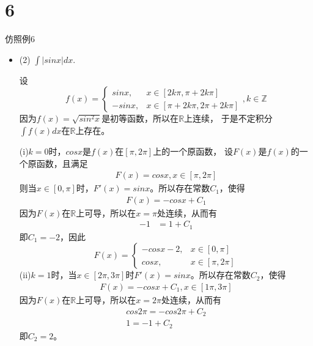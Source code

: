 \documentclass{article}
\begin{document}
\section*{6}

仿照例6

\begin{itemize}
  \item (2) $\int |sinx| dx$.

        设
        \begin{equation*}
          f(x) =
          \begin{cases}
            sinx,  & x \in [2k \pi, \pi + 2k \pi]        \\
            -sinx, & x \in [\pi + 2k \pi, 2\pi + 2k \pi]
          \end{cases}
          , k \in \mathbb{Z}
        \end{equation*}
        因为$f(x) = \sqrt{sin^2x}$是初等函数，所以在$\mathbb{R}$上连续，
        于是不定积分$\int f(x) dx$在$\mathbb{R}$上存在。

        (i)$k = 0$时，$cosx$是$f(x)$在$[\pi, 2\pi]$上的一个原函数，
        设$F(x)$是$f(x)$的一个原函数，且满足
        \begin{align*}
          F(x) = cos x, x \in [\pi, 2\pi]
        \end{align*}
        则当$x \in [0, \pi]$时，$F'(x) = sinx$。所以存在常数$C_1$，使得
        \begin{align*}
          F(x) = -cosx + C_1
        \end{align*}
        因为$F(x)$在$\mathbb{R}$上可导，所以在$x = \pi$处连续，从而有
        \begin{align*}
          -1 & = 1 + C_1
        \end{align*}
        即$C_1 = -2$，因此
        \begin{equation*}
          F(x) =
          \begin{cases}
            -cosx - 2, & x \in [0, \pi]    \\
            cosx,      & x \in [\pi, 2\pi]
          \end{cases}
        \end{equation*}
        (ii)$k = 1$时，当$x \in [2\pi, 3\pi]$时$F'(x) = sin x$。所以存在常数$C_2$，使得
        \begin{align*}
          F(x) = -cos x + C_1, x \in [1\pi, 3\pi]
        \end{align*}
        因为$F(x)$在$\mathbb{R}$上可导，所以在$x = 2\pi$处连续，从而有
        \begin{align*}
          cos 2\pi = -cos 2\pi + C_2 \\
          1 = -1 + C_2
        \end{align*}
        即$C_2 = 2$。


\end{itemize}
\end{document}
